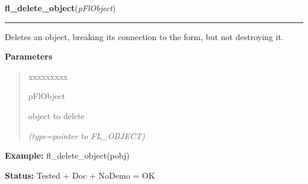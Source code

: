 \hspace{.8\funcindent}\begin{boxedminipage}{\funcwidth}

    \raggedright \textbf{fl\_delete\_object}(\textit{pFlObject})

    \vspace{-1.5ex}

    \rule{\textwidth}{0.5\fboxrule}
\setlength{\parskip}{2ex}
    Deletes an object, breaking its connection to the form, but not 
    destroying it.

\setlength{\parskip}{1ex}
      \textbf{Parameters}
      \vspace{-1ex}

      \begin{quote}
        \begin{Ventry}{xxxxxxxxx}

          \item[pFlObject]

          object to delete

            {\it (type=pointer to FL\_OBJECT)}

        \end{Ventry}

      \end{quote}

\textbf{Example:} fl\_delete\_object(pobj)



\textbf{Status:} Tested + Doc + NoDemo = OK



    \end{boxedminipage}

    \label{xformslib:flbasic:fl_get_object_return_state}

    \vspace{0.5ex}

